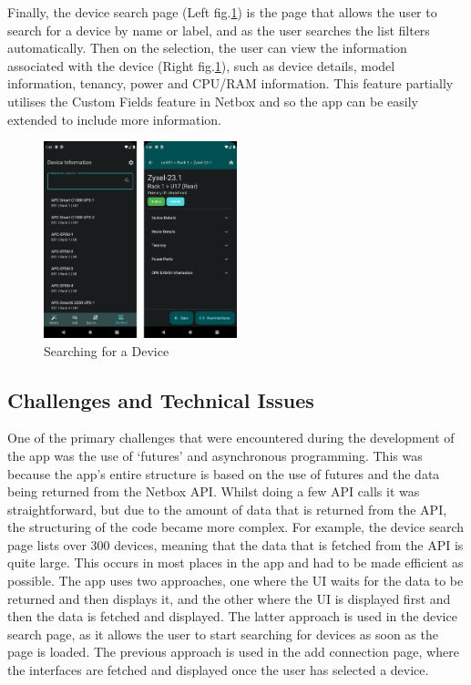 \documentclass [11pt,a4paper]{article}
\begin{document}
Finally, the device search page (Left fig.\ref{fig:device_searhc_and_view}) is the page that allows the user to search for a device by name or label, and as the user searches the list filters automatically. Then on the selection, the user can view the information associated with the device (Right fig.\ref{fig:device_searhc_and_view}), such as device details, model information, tenancy, power and CPU/RAM information. This feature partially utilises the Custom Fields feature in Netbox and so the app can be easily extended to include more information.

\begin{figure}[H]
    \centering
    \includegraphics[width=0.5\textwidth]{images/final_device.png}
    \caption{Searching for a Device}
    \label{fig:device_searhc_and_view}
\end{figure}

\subsection{Challenges and Technical Issues}
\label{sec:challenges}

One of the primary challenges that were encountered during the development of the app was the use of `futures' and asynchronous programming. This was because the app's entire structure is based on the use of futures and the data being returned from the Netbox API. Whilst doing a few API calls it was straightforward, but due to the amount of data that is returned from the API, the structuring of the code became more complex. For example, the device search page lists over 300 devices, meaning that the data that is fetched from the API is quite large. This occurs in most places in the app and had to be made efficient as possible. The app uses two approaches, one where the UI waits for the data to be returned and then displays it, and the other where the UI is displayed first and then the data is fetched and displayed. The latter approach is used in the device search page, as it allows the user to start searching for devices as soon as the page is loaded. The previous approach is used in the add connection page, where the interfaces are fetched and displayed once the user has selected a device. 
\end{document}
